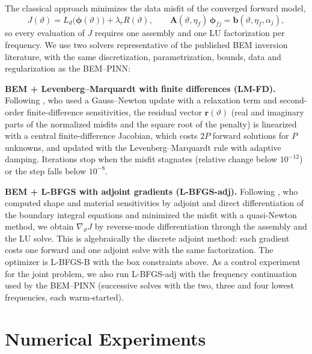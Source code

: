 \documentclass[11pt,twoside]{article}
\begin{document}
The classical approach minimizes the data misfit of the converged forward model,
\begin{equation}\label{eq:classical}
  J(\vartheta) = L_d\bigl(\boldsymbol{\phi}(\vartheta)\bigr) + \lambda_r R(\vartheta),
  \qquad \mathbf{A}(\vartheta,\eta_f)\,\boldsymbol{\phi}_{fj} = \mathbf{b}(\vartheta,\eta_f,\alpha_j),
\end{equation}
so every evaluation of $J$ requires one assembly and one LU factorization per frequency. We use two solvers representative of the published BEM inversion literature, with the same discretization, parametrization, bounds, data and regularization as the BEM--PINN:

\noindent\textbf{BEM + Levenberg--Marquardt with finite differences (LM-FD).} Following \citet{Bignardi2012}, who used a Gauss--Newton update with a relaxation term and second-order finite-difference sensitivities, the residual vector $\mathbf{r}(\vartheta)$ (real and imaginary parts of the normalized misfits and the square root of the penalty) is linearized with a central finite-difference Jacobian, which costs $2P$ forward solutions for $P$ unknowns, and updated with the Levenberg--Marquardt rule \citep{Marquardt1963} with adaptive damping. Iterations stop when the misfit stagnates (relative change below $10^{-12}$) or the step falls below $10^{-8}$.

\noindent\textbf{BEM + L-BFGS with adjoint gradients (L-BFGS-adj).} Following \citet{Bonnet2009}, who computed shape and material sensitivities by adjoint and direct differentiation of the boundary integral equations and minimized the misfit with a quasi-Newton method, we obtain $\nabla_\vartheta J$ by reverse-mode differentiation through the assembly and the LU solve. This is algebraically the discrete adjoint method: each gradient costs one forward and one adjoint solve with the same factorization. The optimizer is L-BFGS-B \citep{Liu1989} with the box constraints above. As a control experiment for the joint problem, we also run L-BFGS-adj with the frequency continuation used by the BEM--PINN (successive solves with the two, three and four lowest frequencies, each warm-started).

\section{Numerical Experiments}\label{sec:experiments}
\end{document}
